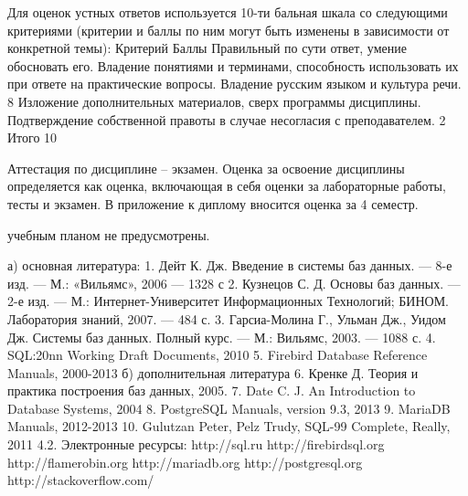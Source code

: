 \documentclass[a4paper]{article}
\begin{document}
Для оценок устных ответов используется 10-ти бальная шкала со следующими критериями (критерии и баллы по ним могут быть изменены в зависимости от конкретной темы):
Критерий	Баллы
Правильный по сути ответ, умение обосновать его. Владение понятиями и терминами, способность использовать их при ответе на практические вопросы. Владение русским языком и культура речи. 	8
Изложение дополнительных материалов, сверх программы дисциплины. Подтверждение собственной правоты в случае несогласия с преподавателем. 	2
Итого	10

Аттестация по дисциплине – экзамен.
Оценка за освоение дисциплины определяется как оценка, включающая в себя оценки за лабораторные работы, тесты и экзамен.
В приложение к диплому вносится оценка за 4 семестр.

\CourseWorksSection

учебным планом не предусмотрены.

\CourseLiteratureSection

а) основная литература:
1.	Дейт К. Дж. Введение в системы баз данных. — 8-е изд. — М.: «Вильямс», 2006 — 1328 с
2.	Кузнецов С. Д. Основы баз данных. — 2-е изд. — М.: Интернет-Университет Информационных Технологий; БИНОМ. Лаборатория знаний, 2007. — 484 с.
3.	Гарсиа-Молина Г., Ульман Дж., Уидом Дж. Системы баз данных. Полный курс. — М.: Вильямс, 2003. — 1088 с.
4.	SQL:20nn Working Draft Documents, 2010
5.	Firebird Database Reference Manuals, 2000-2013
б) дополнительная литература
6.	Кренке Д. Теория и практика построения баз данных, 2005.
7.	Date C. J. An Introduction to Database Systems, 2004
8.	PostgreSQL Manuals, version 9.3, 2013
9.	MariaDB Manuals, 2012-2013
10.	Gulutzan Peter,  Pelz Trudy, SQL-99 Complete, Really, 2011
4.2. Электронные  ресурсы:
http://sql.ru
http://firebirdsql.org
http://flamerobin.org
http://mariadb.org
http://postgresql.org
http://stackoverflow.com/
\end{document}
